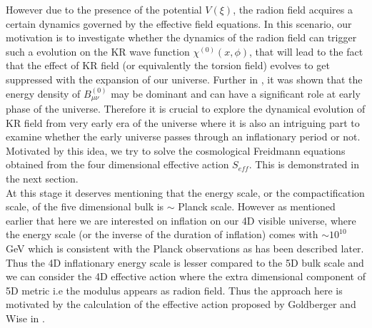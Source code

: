 \documentclass[a4paper]{article}
\begin{document}
However due to the presence of the potential $V(\xi)$, 
the radion field acquires a certain dynamics governed by the effective field equations. In this  scenario, our motivation is to investigate  whether 
the dynamics of the radion field can trigger such a evolution on the KR wave function $\chi^{(0)}(x,\phi)$, that will lead 
to the fact that the effect of KR field (or equivalently the torsion field) evolves to get suppressed with the expansion of our universe. 
Further in \cite{ashmita}, it was shown that the energy density of $B^{(0)}_{\mu\nu}$ may be dominant and can have a significant role 
at early phase of the universe. Therefore it is crucial to explore the dynamical evolution of KR field from very early era of the 
universe where it is also an intriguing part to examine whether the early universe passes through an inflationary period or not. 
Motivated by this idea, we try to solve the cosmological Freidmann equations obtained from the four dimensional effective action $S_{eff}$. 
This is demonstrated in the next section.\\
At this stage it deserves mentioning that the energy scale, or the compactification scale, of the five dimensional bulk is $\sim$ Planck scale. However 
as mentioned earlier that here we are interested on inflation on our 4D visible universe, 
where the energy scale (or the inverse of the duration of inflation) comes 
with $\sim 10^{10}$ GeV which is consistent with the Planck observations as has been described later. Thus the 4D inflationary energy scale is 
lesser compared to the 5D bulk scale and we can consider the 4D effective action where the extra dimensional component of 5D metric i.e the modulus 
appears as radion field. Thus the approach here is motivated by the calculation of the effective action proposed 
by Goldberger and Wise in \cite{GW,GW_radion}.
\end{document}
